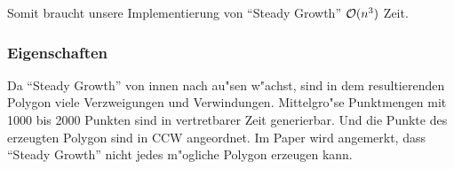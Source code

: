     Somit braucht unsere Implementierung von \enquote{Steady Growth}
    $\mathcal{O}(n^3)$ Zeit.

  \subsubsection{Eigenschaften}

    Da \enquote{Steady Growth} von innen nach au"sen w"achst, sind in dem
    resultierenden Polygon viele Verzweigungen und Verwindungen. Mittelgro"se
    Punktmengen mit 1000 bis 2000 Punkten sind in vertretbarer Zeit generierbar.
    Und die Punkte des erzeugten Polygon sind in CCW angeordnet. Im Paper
    \cite{held98polygons} wird angemerkt, dass \enquote{Steady Growth} nicht
    jedes m"ogliche Polygon erzeugen kann.
